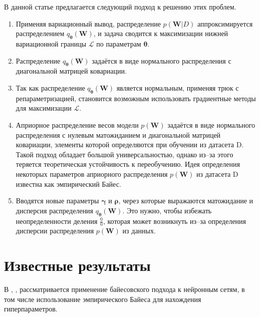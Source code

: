 \documentclass{article}
\numberwithin{equation}{section}
\begin{document}
    В данной статье предлагается следующий подход к решению этих проблем.

    \begin{enumerate}
        \item Применяя вариационный вывод, распределение $p(\pmb{W}| D)$
            аппроксимируется распределением $q_{\pmb{\theta}}(\pmb{W})$,
            и задача сводится к максимизации нижней вариационной границы
            $\mathcal{L}$ по параметрам $\pmb{\theta}$.
        \item Распределение $q_{\pmb{\theta}}(\pmb{W})$
            задаётся в виде нормального распределения с диагональной матрицей ковариации.
        \item Так как распределение $q_{\pmb{\theta}}(\pmb{W})$
            является нормальным, применяя трюк с репараметризацией,
            становится возможным использовать градиентные методы
            для максимизации $\mathcal{L}$.
        \item Априорное распределение весов модели $p(\pmb{W})$
            задаётся в виде нормального распределения с нулевым матожиданием
            и диагональной матрицей ковариации, элементы которой определяются при обучении из датасета D.
            Такой подход обладает большой универсальностью,
            однако из--за этого теряется теоретическая устойчивость к переобучению.
            Идея определения некоторых параметров априорного распределения
            $p(\pmb{W})$ из датасета D
            известна как эмпирический Байес.
        \item Вводятся новые параметры $\pmb{\gamma}$ и $\pmb{\rho}$,
            через которые выражаются матожидание и дисперсия распределения
            $q_{\pmb{\theta}}(\pmb{W})$.
            Это нужно, чтобы избежать неопределенности деления $\frac{0}{0}$,
            которая может возникнуть из--за определения дисперсии распределения $p(\pmb{W})$ из данных.
    \end{enumerate}

    \section{Известные результаты}

    В \cite{mackay_1992a}, \cite{mackay_1992b}, \cite{mackay_1992c}
    рассматривается применение байесовского подхода к нейронным сетям,
    в том числе использование эмпирического Байеса
    для нахождения гиперпараметров.
\end{document}
